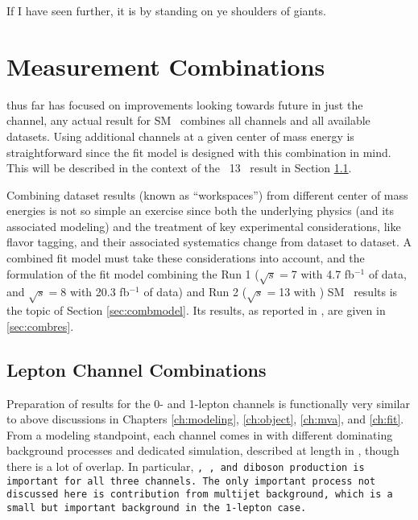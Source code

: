 \begin{savequote}[75mm]
If I have seen further, it is by standing on ye shoulders of giants.
\end{savequote}

\chapter{Measurement Combinations}
\label{ch:comb}
 thus far has focused on improvements looking towards future in just the \ZH\, channel, any actual result for SM \vhbb\, combines all channels and all available datasets.  Using additional channels at a given center of mass energy is straightforward since the fit model is designed with this combination in mind.  This will be described in the context of the \lumi\ 13 \tev\ result in Section \ref{sec:run2}.

  Combining dataset results (known as ``workspaces'') from different center of mass energies is not so simple an exercise since both the underlying physics (and its associated modeling) and the treatment of key experimental considerations, like flavor tagging, and their associated systematics change from dataset to dataset.  A combined fit model must take these considerations into account, and the formulation of the fit model combining the Run 1 ($\sqrt{s}=$7 \TeV with 4.7 fb$^{-1}$ of data, and $\sqrt{s}=$8 \TeV with 20.3 fb$^{-1}$ of data) and Run 2 ($\sqrt{s}=$13 \TeV with \lumi) SM \vhbb\, results is the topic of Section \ref{sec:combmodel}.  Its results, as reported in \cite{paper}, are given in \ref{sec:combres}.

\section{Lepton Channel Combinations}
\label{sec:run2}
Preparation of results for the 0- and 1-lepton channels is functionally very similar to above discussions in Chapters \ref{ch:modeling}, \ref{ch:object}, \ref{ch:mva}, and \ref{ch:fit}.  From a modeling standpoint, each channel comes in with different dominating background processes and dedicated simulation, described at length in \cite{modelingnote}, though there is a lot of overlap.  In particular, \tt, \vjets, and diboson production is important for all three channels.  The only important process not discussed here is contribution from multijet background, which is a small but important background in the 1-lepton case.

